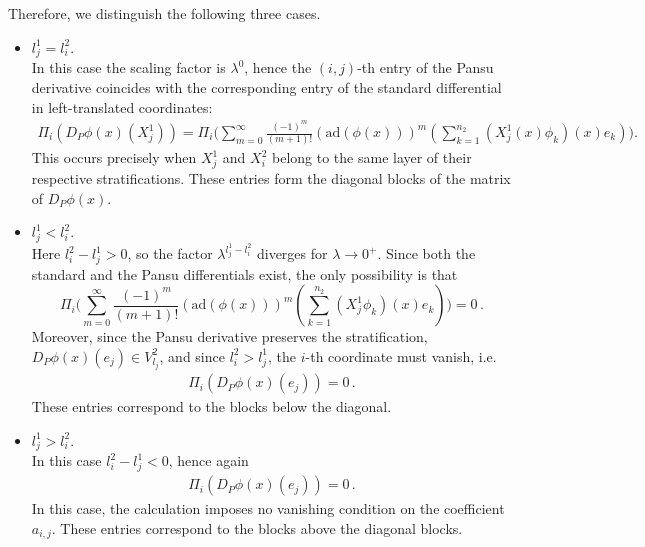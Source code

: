 \documentclass[dvipsnames]{amsart}
\theoremstyle{definition}
\theoremstyle{definition}
\numberwithin{equation}{section}
\begin{document}
 Therefore, we distinguish the following three cases.
 \begin{itemize}
     \item[When] $l_j^1 = l_i^2$.\\
     In this case the scaling factor is $\lambda^0$, hence the $(i,j)$-th entry of the Pansu derivative coincides with the corresponding entry of the standard differential in left-translated coordinates:
     \begin{align*}
        \Pi_i( D_P\phi(x) (X_j^1)) =  \Pi_{i} \Big ( \sum_{m=0}^{\infty}\frac{(-1)^m}{(m+1)!}(\text{ad}(\phi(x)))^m ( \sum_{k=1}^{n_2} (X_j^1(x)\phi_k)(x) e_k ) \Big).
    \end{align*}
    This occurs precisely when $X_j^1$ and $X_i^2$ belong to the same layer of their respective stratifications. These entries form the diagonal blocks of the matrix of $D_P\phi(x)$.
     \item[When] $l_j^1 < l_i^2$.\\ 
     Here $l_i^2-l_j^1>0$, so the factor $\lambda^{l_j^1 -l_i^2}$ diverges for $\lambda \rightarrow 0^+$. 
     Since both the standard and the Pansu differentials exist, the only possibility is that
    \begin{equation}\label{contact equation in charts}
        \Pi_{i} \Big ( \sum_{m=0}^{\infty}\frac{(-1)^m}{(m+1)!}(\text{ad}(\phi(x)))^m ( \sum_{k=1}^{n_2} (X_j^1\phi_k)(x) e_k ) \Big) = 0\,.
    \end{equation}
    Moreover, since the Pansu derivative preserves the stratification, $D_P\phi(x)(e_j)\in V_{l_j}^2$, and since $l_i^2>l_j^1$, the $i$-th coordinate must vanish, i.e.
    \begin{align*}
        \Pi_i( D_P\phi(x) (e_j)) = 0\,.
    \end{align*}
    These entries correspond to the blocks below the diagonal.
     \item[When] $l_j^1 > l_i^2$.\\ 
     In this case $l_i^2-l_j^1<0$, hence again
    \begin{align*}
        \Pi_i( D_P\phi(x) (e_j)) = 0\,.
    \end{align*}
    In this case, the calculation imposes no vanishing
condition on the coefficient $a_{i,j}$. These entries correspond to the blocks above the diagonal blocks.
 \end{itemize}
\end{document}
